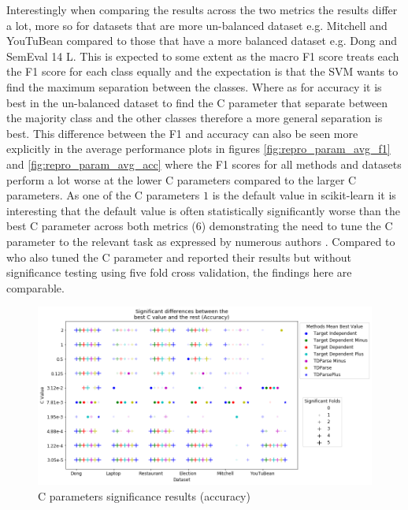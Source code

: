 Interestingly when comparing the results across the two metrics the results differ a lot, more so for datasets that are more un-balanced dataset e.g. Mitchell and YouTuBean compared to those that have a more balanced dataset e.g. Dong and SemEval 14 L. This is expected to some extent as the macro F1 score treats each the F1 score for each class equally and the expectation is that the SVM wants to find the maximum separation between the classes. Where as for accuracy it is best in the un-balanced dataset to find the C parameter that separate between the majority class and the other classes therefore a more general separation is best. This difference between the F1 and accuracy can also be seen more explicitly in the average performance plots in figures \ref{fig:repro_param_avg_f1} and \ref{fig:repro_param_avg_acc} where the F1 scores for all methods and datasets perform a lot worse at the lower C parameters compared to the larger C parameters. As one of the C parameters $1$ is the default value in scikit-learn it is interesting that the default value is often statistically significantly worse than the best C parameter across both metrics (6) demonstrating the need to tune the C parameter to the relevant task as expressed by numerous authors \citep{fan2008liblinear,vo2015target,wang-etal-2017-tdparse}. Compared to \citet{vo2015target} who also tuned the C parameter and reported their results but without significance testing using five fold cross validation, the findings here are comparable.
\begin{figure}
    \centering
    \includegraphics[scale=0.55]{images/reproducibility/Parameters/C_Parameter/C_Sig_Plot_Accuracy.png}
    \caption{C parameters significance results (accuracy)}
    \label{fig:repro_param_c_sig_acc}
\end{figure}
